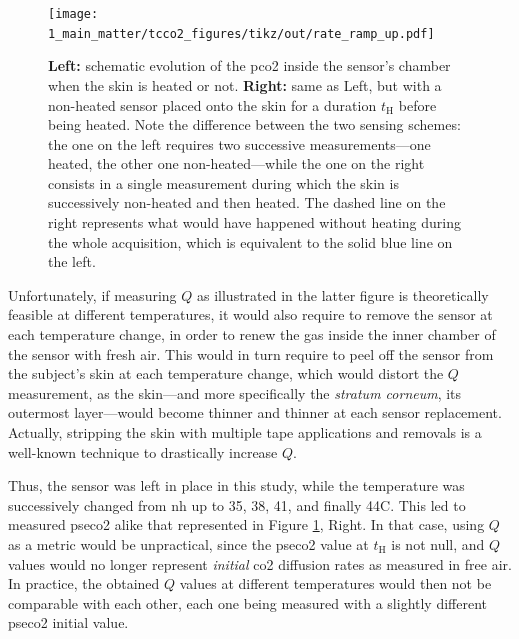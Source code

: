 \begin{figure}
	\centering
	\texttt{[image: 1\_main\_matter/tcco2\_figures/tikz/out/rate\_ramp\_up.pdf]}
	\caption[\gls{pseco2} ramp up in single- or multiple-temperatures measurement scenarios.]{\textbf{Left:} schematic evolution of the \gls{pco2} inside the sensor's chamber when the skin is heated or not. \textbf{Right:} same as Left, but with a non-heated sensor placed onto the skin for a duration $t_\text{H}$ before being heated. Note the difference between the two sensing schemes: the one on the left requires two successive measurements---one heated, the other one non-heated---while the one on the right consists in a single measurement during which the skin is successively non-heated and then heated. The dashed line on the right represents what would have happened without heating during the whole acquisition, which is equivalent to the solid blue line on the left.}\label{fig:tcco2:rate_principle}
\end{figure}

Unfortunately, if measuring $Q$ as illustrated in the latter figure is theoretically feasible at different temperatures, it would also require to remove the sensor at each temperature change, in order to renew the gas inside the inner chamber of the sensor with fresh air. This would in turn require to peel off the sensor from the subject's skin at each temperature change, which would distort the $Q$ measurement, as the skin---and more specifically the \textit{stratum corneum}, its outermost layer---would become thinner and thinner at each sensor replacement. Actually, stripping the skin with multiple tape applications and removals is a well-known technique to drastically increase $Q$\cite{scheuplein1976, eletr1978, greenspan1981}.

Thus, the sensor was left in place in this study, while the temperature was successively changed from \gls{nh} up to 35, 38, 41, and finally 44{\degree}C. This led to measured \gls{pseco2} alike that represented in Figure \ref{fig:tcco2:rate_principle}, Right. In that case, using $Q$ as a metric would be unpractical, since the \gls{pseco2} value at $t_\text{H}$ is not null, and $Q$ values would no longer represent \emph{initial} \gls{co2} diffusion rates as measured in free air. In practice, the obtained $Q$ values at different temperatures would then not be comparable with each other, each one being measured with a slightly different \gls{pseco2} initial value.

